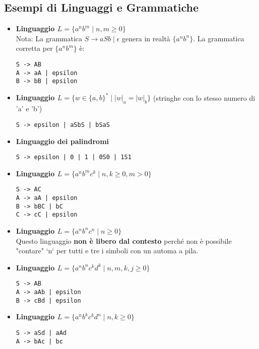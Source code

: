\subsection{Esempi di Linguaggi e Grammatiche}
\begin{itemize}
    \item \textbf{Linguaggio $L = \{a^n b^m \mid n, m \ge 0\}$} \\
    Nota: La grammatica $S \rightarrow aSb \mid \epsilon$ genera in realtà $\{a^n b^n\}$. La grammatica corretta per $\{a^n b^m\}$ è:
    \begin{Verbatim}[frame=single]
S -> AB
A -> aA | epsilon
B -> bB | epsilon
    \end{Verbatim}

    \item \textbf{Linguaggio $L = \{w \in \{a,b\}^* \mid |w|_a = |w|_b\}$} (stringhe con lo stesso numero di 'a' e 'b')
    \begin{Verbatim}[frame=single]
S -> epsilon | aSbS | bSaS
    \end{Verbatim}

    \item \textbf{Linguaggio dei palindromi}
    \begin{Verbatim}[frame=single]
S -> epsilon | 0 | 1 | 0S0 | 1S1
    \end{Verbatim}
    
    \item \textbf{Linguaggio $L = \{a^n b^m c^k \mid n, k \ge 0, m > 0\}$}
    \begin{Verbatim}[frame=single]
S -> AC
A -> aA | epsilon
B -> bBC | bC
C -> cC | epsilon
    \end{Verbatim}

    \item \textbf{Linguaggio $L = \{a^n b^n c^n \mid n \ge 0\}$} \\
    Questo linguaggio \textbf{non è libero dal contesto} perché non è possibile "contare" `n` per tutti e tre i simboli con un automa a pila.


    \item \textbf{Linguaggio $L = \{a^n b^n c^k d^k \mid n,m,k,j \ge 0\}$}
    \begin{Verbatim}[frame=single]
S -> AB
A -> aAb | epsilon
B -> cBd | epsilon
    \end{Verbatim}

    \item \textbf{Linguaggio $L = \{a^n b^k c^k d^n \mid n,k \ge 0\}$}
    \begin{Verbatim}[frame=single]
S -> aSd | aAd
A -> bAc | bc
    \end{Verbatim}


\end{itemize}
